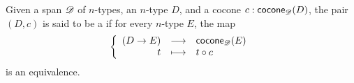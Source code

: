 \begin{defn}
  Given a span $\mathscr{D}$ of $n$-types, an $n$-type $D$, and a cocone
  $c:\mathsf{cocone}_{\mathscr{D}}(D)$, the pair $(D,c)$ is said to be a 
  if for every $n$-type $E$, the map
  \[\left\{\begin{array}{rcl}(D\to{}E) & \longrightarrow & \mathsf{cocone}_{\mathscr{D}}(E) \\ t & \longmapsto & t\circ c \end{array}\right.\]
  is an equivalence.
\end{defn}

